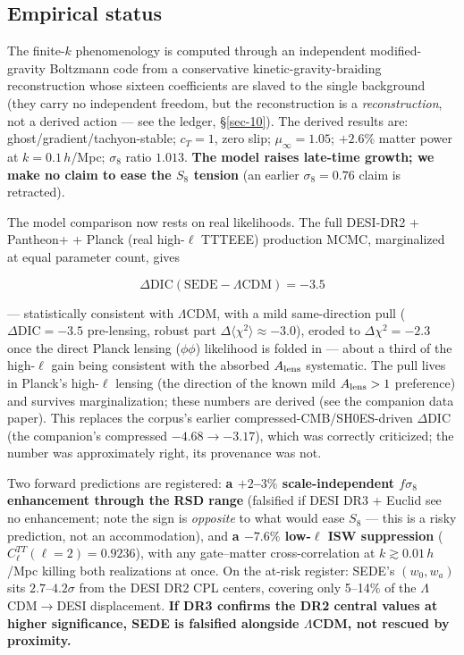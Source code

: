 \documentclass[submission, Phys]{SciPost}
\begin{document}
\subsection{Empirical status}\label{sec-2-3}

The finite-\(k\) phenomenology is computed through an independent
modified-gravity Boltzmann code from a conservative
kinetic-gravity-braiding reconstruction whose sixteen coefficients are
slaved to the single background (they carry no independent freedom, but
the reconstruction is a \emph{reconstruction}, not a derived action ---
see the ledger, §\ref{sec-10}). The derived results are:
ghost/gradient/tachyon-stable; \(c_T = 1\), zero slip;
\(\mu_\infty = 1.05\); \(+2.6\%\) matter power at \(k = 0.1\,h\)/Mpc;
\(\sigma_8\) ratio \(1.013\). \textbf{The model raises late-time growth;
we make no claim to ease the \(S_8\) tension} (an earlier
\(\sigma_8 = 0.76\) claim is retracted).

The model comparison now rests on real likelihoods. The full DESI-DR2 +
Pantheon+ + Planck (real high-\(\ell\) TTTEEE) production MCMC,
marginalized at equal parameter count, gives

\begin{equation}
\Delta\mathrm{DIC}(\mathrm{SEDE} - \Lambda\mathrm{CDM}) = -3.5
\end{equation}

--- statistically consistent with \(\Lambda\)CDM, with a mild
same-direction pull (\(\Delta\mathrm{DIC} = -3.5\) pre-lensing, robust
part \(\Delta\langle\chi^2\rangle \approx -3.0\)), eroded to
\(\Delta\chi^2 = -2.3\) once the direct Planck lensing (\(\phi\phi\))
likelihood is folded in --- about a third of the high-\(\ell\) gain
being consistent with the absorbed \(A_{\rm lens}\) systematic. The pull
lives in Planck's high-\(\ell\) lensing (the direction of the known mild
\(A_{\rm lens}>1\) preference) and survives marginalization; these
numbers are derived (see the companion data paper). This replaces the
corpus's earlier compressed-CMB/SH0ES-driven \(\Delta\mathrm{DIC}\) (the
companion's compressed \(-4.68\to-3.17\)), which was correctly
criticized; the number was approximately right, its provenance was not.

Two forward predictions are registered: \textbf{a \(+2\)--\(3\%\)
scale-independent \(f\sigma_8\) enhancement through the RSD range}
(falsified if DESI DR3 + Euclid see no enhancement; note the sign is
\emph{opposite} to what would ease \(S_8\) --- this is a risky
prediction, not an accommodation), and \textbf{a \(-7.6\%\) low-\(\ell\)
ISW suppression} (\(C_\ell^{TT}(\ell{=}2) = 0.9236\)), with any
gate--matter cross-correlation at \(k\gtrsim 0.01\,h\)/Mpc killing both
realizations at once. On the at-risk register: SEDE's \((w_0, w_a)\)
sits \(2.7\)--\(4.2\sigma\) from the DESI DR2 CPL centers, covering only
5--14\% of the \(\Lambda\)CDM\(\to\)DESI displacement. \textbf{If DR3
confirms the DR2 central values at higher significance, SEDE is
falsified alongside \(\Lambda\)CDM, not rescued by proximity.}
\end{document}

